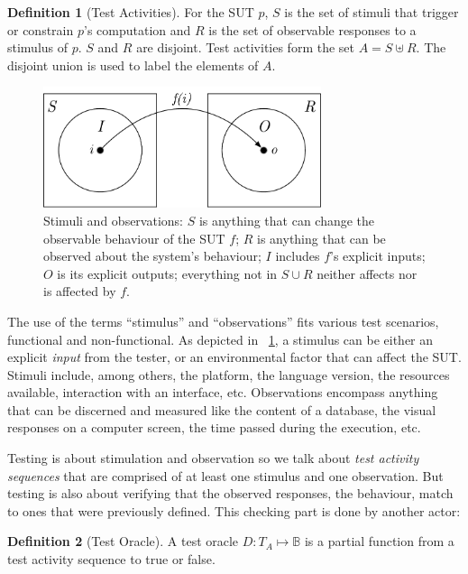 \documentclass[11pt]{sdm_internship}
\theoremstyle{definition}
\newtheorem{definition}{Definition}[section]
\begin{document}
\begin{definition}[Test Activities]
  For the SUT $p$, $S$ is the set of stimuli that trigger or constrain $p$'s computation and $R$ is the set of observable responses to a stimulus of $p$.
  $S$ and $R$ are disjoint.
  Test activities form the set $A = S\uplus{}R$.
  The disjoint union is used to label the elements of $A$.
\end{definition}

\begin{figure}
  \centering
  \includegraphics[width=22em]{stim_and_obs}
  \caption{Stimuli and observations: $S$ is anything that can change the observable behaviour of the SUT $f$; $R$ is anything that can be observed about the system's behaviour; $I$ includes $f$'s explicit inputs; $O$ is its explicit outputs; everything not in $S \cup R$ neither affects nor is affected by $f$.}%
  \label{fig:test_activity}
\end{figure}

The use of the terms ``stimulus'' and ``observations'' fits various test scenarios, functional and non-functional.
As depicted in \figurename~\ref{fig:test_activity}, a stimulus can be either an explicit \emph{input} from the tester, or an environmental factor that can affect the SUT\@.
Stimuli include, among others, the platform, the language version, the resources available, interaction with an interface, etc.
Observations encompass anything that can be discerned and measured like the content of a database, the visual responses on a computer screen, the time passed during the execution, etc.

Testing is about stimulation and observation so we talk about \emph{test activity sequences} that are comprised of at least one stimulus and one observation.
But testing is also about verifying that the observed responses, the behaviour, match to ones that were previously defined.
This checking part is done by another actor:

\begin{definition}[Test Oracle]
  A test oracle $D : T_A \mapsto \mathbb{B}$ is a partial function from a test activity sequence to true or false.
\end{definition}
\end{document}
